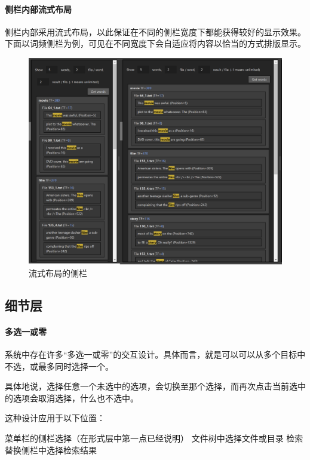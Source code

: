 \documentclass[scheme = chinese]{ctexart}
\begin{document}
\paragraph{侧栏内部流式布局}
侧栏内部采用流式布局，以此保证在不同的侧栏宽度下都能获得较好的显示效果。下面以词频侧栏为例，可见在不同宽度下会自适应将内容以恰当的方式排版显示。

\begin{figure}[h]
    \centering
    \includegraphics[width=\textwidth]{images/形式-流动.png}
    \caption{流式布局的侧栏}
\end{figure}

\clearpage

\subsection{细节层}

\paragraph{多选一或零}
系统中存在许多“多选一或零”的交互设计。具体而言，就是可以可以从多个目标中不选，或最多同时选择一个。

具体地说，选择任意一个未选中的选项，会切换至那个选择，而再次点击当前选中的选项会取消选择，什么也不选中。

这种设计应用于以下位置：
\begin{outline}
    \1 菜单栏的侧栏选择（在形式层中第一点已经说明）
    \1 文件树中选择文件或目录
    \1 检索替换侧栏中选择检索结果
\end{outline}
\end{document}

